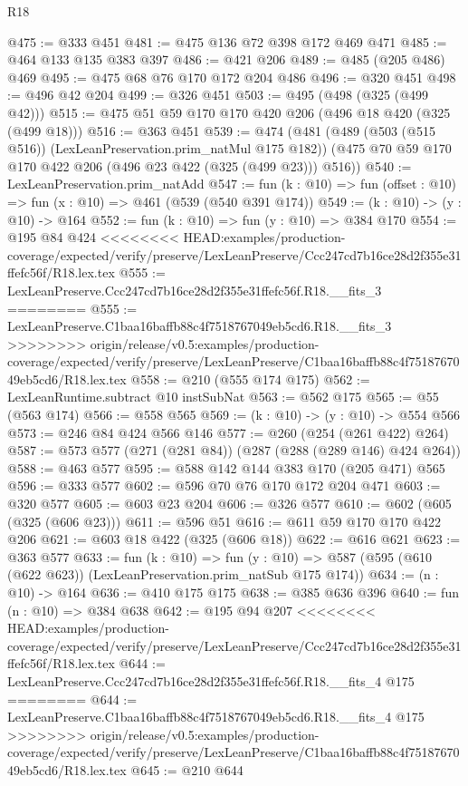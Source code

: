 \begin{lexlean}{R18}
\begin{coremodule}
{{{{{{{{{{{{{@475 := @333 @451
@481 := @475 @136 @72 @398 @172 @469 @471
@485 := @464 @133 @135 @383 @397
@486 := @421 @206
@489 := @485 (@205 @486) @469
@495 := @475 @68 @76 @170 @172 @204 @486
@496 := @320 @451
@498 := @496 @42 @204
@499 := @326 @451
@503 := @495 (@498 (@325 (@499 @42)))
@515 := @475 @51 @59 @170 @170 @420 @206 (@496 @18 @420 (@325 (@499 @18)))
@516 := @363 @451
@539 := @474
    (@481
      (@489 (@503 (@515 @516)) (LexLeanPreservation.prim_natMul @175 @182))
      (@475 @70 @59 @170 @170 @422 @206 (@496 @23 @422 (@325 (@499 @23))) @516))
@540 := LexLeanPreservation.prim_natAdd
@547 := fun (k : @10) => fun (offset : @10) => fun (x : @10) => @461 (@539 (@540 @391 @174))
@549 := (k : @10) -> (y : @10) -> @164
@552 := fun (k : @10) => fun (y : @10) => @384 @170
@554 := @195 @84 @424
<<<<<<<< HEAD:examples/production-coverage/expected/verify/preserve/LexLeanPreserve/Ccc247cd7b16ce28d2f355e31ffefc56f/R18.lex.tex
@555 := LexLeanPreserve.Ccc247cd7b16ce28d2f355e31ffefc56f.R18.__fits_3
========
@555 := LexLeanPreserve.C1baa16baffb88c4f7518767049eb5cd6.R18.__fits_3
>>>>>>>> origin/release/v0.5:examples/production-coverage/expected/verify/preserve/LexLeanPreserve/C1baa16baffb88c4f7518767049eb5cd6/R18.lex.tex
@558 := @210 (@555 @174 @175)
@562 := LexLeanRuntime.subtract @10 instSubNat
@563 := @562 @175
@565 := @55 (@563 @174)
@566 := @558 @565
@569 := (k : @10) -> (y : @10) -> @554 @566
@573 := @246 @84 @424 @566 @146
@577 := @260 (@254 (@261 @422) @264)
@587 := @573 @577 (@271 (@281 @84)) (@287 (@288 (@289 @146) @424 @264))
@588 := @463 @577
@595 := @588 @142 @144 @383 @170 (@205 @471) @565
@596 := @333 @577
@602 := @596 @70 @76 @170 @172 @204 @471
@603 := @320 @577
@605 := @603 @23 @204
@606 := @326 @577
@610 := @602 (@605 (@325 (@606 @23)))
@611 := @596 @51
@616 := @611 @59 @170 @170 @422 @206
@621 := @603 @18 @422 (@325 (@606 @18))
@622 := @616 @621
@623 := @363 @577
@633 := fun (k : @10) =>
  fun (y : @10) => @587 (@595 (@610 (@622 @623)) (LexLeanPreservation.prim_natSub @175 @174))
@634 := (n : @10) -> @164
@636 := @410 @175 @175
@638 := @385 @636 @396
@640 := fun (n : @10) => @384 @638
@642 := @195 @94 @207
<<<<<<<< HEAD:examples/production-coverage/expected/verify/preserve/LexLeanPreserve/Ccc247cd7b16ce28d2f355e31ffefc56f/R18.lex.tex
@644 := LexLeanPreserve.Ccc247cd7b16ce28d2f355e31ffefc56f.R18.__fits_4 @175
========
@644 := LexLeanPreserve.C1baa16baffb88c4f7518767049eb5cd6.R18.__fits_4 @175
>>>>>>>> origin/release/v0.5:examples/production-coverage/expected/verify/preserve/LexLeanPreserve/C1baa16baffb88c4f7518767049eb5cd6/R18.lex.tex
@645 := @210 @644
}}}}}}}}}}}}}
\end{coremodule}
\end{lexlean}
